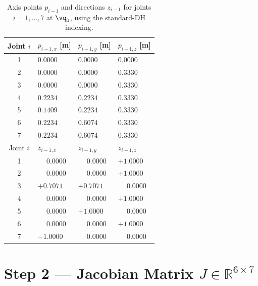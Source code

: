 \begin{table}[htb]
\centering
\caption{Axis points \(p_{i-1}\) and directions
         \(z_{i-1}\) for joints \(i=1,\ldots,7\) at
         \(\vq_0\), using the standard-DH indexing.}
\label{tab:panda_fk}
\renewcommand{\arraystretch}{1.3}
\begin{tabular}{@{}cp{3.0cm}p{1.8cm}p{6.5cm}@{}}
\toprule
Joint \(i\) & $p_{i-1,x}$ [m] & $p_{i-1,y}$ [m] & $p_{i-1,z}$ [m] \\
\midrule
1 & $0.0000$ & $0.0000$ & $0.0000$ \\
2 & $0.0000$ & $0.0000$ & $0.3330$ \\
3 & $0.0000$ & $0.0000$ & $0.3330$ \\
4 & $0.2234$ & $0.2234$ & $0.3330$ \\
5 & $0.1409$ & $0.2234$ & $0.3330$ \\
6 & $0.2234$ & $0.6074$ & $0.3330$ \\
7 & $0.2234$ & $0.6074$ & $0.3330$ \\
\midrule
Joint \(i\) & $z_{i-1,x}$ & $z_{i-1,y}$ & $z_{i-1,z}$ \\
\midrule
1 & $\phantom{-}0.0000$ & $\phantom{-}0.0000$ & $+1.0000$ \\
2 & $\phantom{-}0.0000$ & $\phantom{-}0.0000$ & $+1.0000$ \\
3 & $+0.7071$ & $+0.7071$ & $\phantom{-}0.0000$ \\
4 & $\phantom{-}0.0000$ & $\phantom{-}0.0000$ & $+1.0000$ \\
5 & $\phantom{-}0.0000$ & $+1.0000$ & $\phantom{-}0.0000$ \\
6 & $\phantom{-}0.0000$ & $\phantom{-}0.0000$ & $+1.0000$ \\
7 & $-1.0000$ & $\phantom{-}0.0000$ & $\phantom{-}0.0000$ \\
\bottomrule
\end{tabular}
\end{table}

\section{Step 2 --- Jacobian Matrix \texorpdfstring{$J \in \mathbb{R}^{6\times7}$}{J in R(6x7)}}
\label{app:panda_jacobian}

